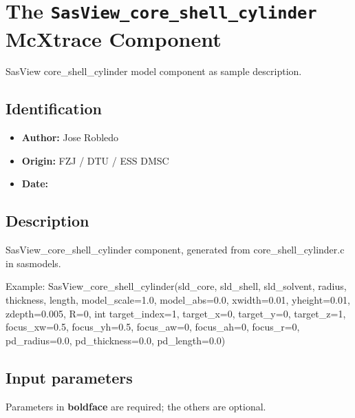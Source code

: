 \section{The \texttt{SasView\_core\_shell\_cylinder} McXtrace Component}
SasView core\_shell\_cylinder model component as sample description.

\subsection*{Identification}
\begin{itemize}
  \item \textbf{Author:} Jose Robledo
  \item \textbf{Origin:} FZJ / DTU / ESS DMSC
  \item \textbf{Date:} 
\end{itemize}

\subsection*{Description}
SasView\_core\_shell\_cylinder component, generated from core\_shell\_cylinder.c in sasmodels.

Example: SasView\_core\_shell\_cylinder(sld\_core, sld\_shell, sld\_solvent, radius, thickness, length, model\_scale=1.0, model\_abs=0.0, xwidth=0.01, yheight=0.01, zdepth=0.005, R=0, int target\_index=1, target\_x=0, target\_y=0, target\_z=1, focus\_xw=0.5, focus\_yh=0.5, focus\_aw=0, focus\_ah=0, focus\_r=0, pd\_radius=0.0, pd\_thickness=0.0, pd\_length=0.0)

\subsection*{Input parameters}
Parameters in \textbf{boldface} are required; the others are optional.

